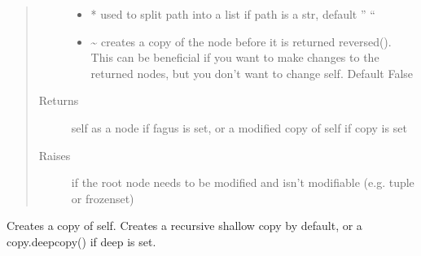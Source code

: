 \documentclass[a4paper,10pt,english]{sphinxmanual}
\begin{document}
\begin{fulllineitems}
\begin{fulllineitems}
\begin{quote}
\begin{description}
\begin{itemize}
\item {}
\sphinxAtStartPar
{} \textendash{} * used to split path into a list if path is a str, default ” “

\item {}
\sphinxAtStartPar
{} \textendash{} \textasciitilde{} creates a copy of the node before it is returned reversed(). This can be beneficial if you want to
make changes to the returned nodes, but you don’t want to change self. Default False

\end{itemize}

\item[{Returns}] \leavevmode
\sphinxAtStartPar
self as a node if fagus is set, or a modified copy of self if copy is set

\item[{Raises}] \leavevmode
\sphinxAtStartPar
{} \textendash{} if the root node needs to be modified and isn’t modifiable (e.g. tuple or frozenset)

\end{description}\end{quote}

\end{fulllineitems}


\begin{fulllineitems}
\label{\detokenize{fagus.fagus:fagus.fagus.Fagus.copy}}
\pysigstartsignatures
{}
\pysigstopsignatures
\sphinxAtStartPar
Creates a copy of self. Creates a recursive shallow copy by default, or a copy.deepcopy() if deep is set.

\end{fulllineitems}



\end{fulllineitems}
\end{document}
